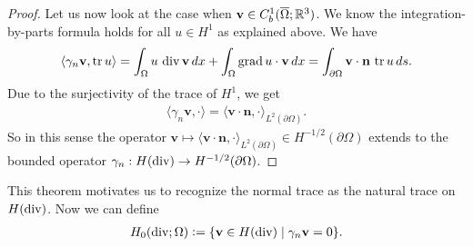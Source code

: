 \documentclass[../master_thesis.tex]{subfiles}
\begin{document}
\begin{proof}
    Let us now look at the case when $\mathbf{v} \in C_b^1(\overline{\Omega}; \mathbb{R}^3)$.
    We know the integration-by-parts formula holds for all $u \in H^1$ as 
    explained above. We have
    \begin{align*}
        \langle \gamma_n \mathbf{v}, \operatorname{tr} u \rangle = 
        \int_\Omega u \, \operatorname{div} \mathbf{v} \, dx 
            + \int_\Omega \operatorname{grad} u \cdot \mathbf{v} \, dx
        = \int_{\partial \Omega} \mathbf{v}\cdot \mathbf{n} \, \operatorname{tr} u \, ds.
    \end{align*}
    Due to the surjectivity of the trace of $H^1$, we get 
    \begin{align*}
        \langle \gamma_n \mathbf{v}, \cdot \rangle = \langle \mathbf{v} \cdot \mathbf{n}, \cdot \rangle_{L^2(\partial\Omega)}.
    \end{align*}
    So in this sense the operator 
    $\mathbf{v} \mapsto \langle \mathbf{v} \cdot \mathbf{n}, \cdot \rangle_{L^2(\partial\Omega)} 
    \in H^{-1/2}(\partial \Omega)$ extends to the bounded operator $\gamma_n: H(\operatorname{div}) \rightarrow H^{-1/2}(\partial \Omega)$.
\end{proof}
This theorem motivates us to recognize the normal trace as the natural trace 
on $H(\operatorname{div})$. Now we can define 
\begin{align*}
    H_0(\operatorname{div};\Omega) \vcentcolon= \{ \mathbf{v} \in H(\operatorname{div}) \mid \gamma_n \mathbf{v}=0 \}.
\end{align*}

\end{document}

